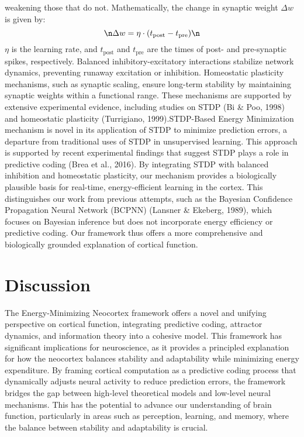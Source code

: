 \documentclass{article}
\begin{document}
weakening those that do not. Mathematically, the change in synaptic weight \(\Delta w\) is given by:\n\begin{equation}\n\Delta w = \eta \cdot (t_{\text{post}} - t_{\text{pre}})\n\end{equation}\nwhere \(\eta\) is the learning rate, and \(t_{\text{post}}\) and \(t_{\text{pre}}\) are the times of post- and pre-synaptic spikes, respectively. Balanced inhibitory-excitatory interactions stabilize network dynamics, preventing runaway excitation or inhibition. Homeostatic plasticity mechanisms, such as synaptic scaling, ensure long-term stability by maintaining synaptic weights within a functional range. These mechanisms are supported by extensive experimental evidence, including studies on STDP (Bi & Poo, 1998) and homeostatic plasticity (Turrigiano, 1999).\n\nThe STDP-Based Energy Minimization mechanism is novel in its application of STDP to minimize prediction errors, a departure from traditional uses of STDP in unsupervised learning. This approach is supported by recent experimental findings that suggest STDP plays a role in predictive coding (Brea et al., 2016). By integrating STDP with balanced inhibition and homeostatic plasticity, our mechanism provides a biologically plausible basis for real-time, energy-efficient learning in the cortex. This distinguishes our work from previous attempts, such as the Bayesian Confidence Propagation Neural Network (BCPNN) (Lansner & Ekeberg, 1989), which focuses on Bayesian inference but does not incorporate energy efficiency or predictive coding. Our framework thus offers a more comprehensive and biologically grounded explanation of cortical function.

\section{Discussion}
The Energy-Minimizing Neocortex framework offers a novel and unifying perspective on cortical function, integrating predictive coding, attractor dynamics, and information theory into a cohesive model. This framework has significant implications for neuroscience, as it provides a principled explanation for how the neocortex balances stability and adaptability while minimizing energy expenditure. By framing cortical computation as a predictive coding process that dynamically adjusts neural activity to reduce prediction errors, the framework bridges the gap between high-level theoretical models and low-level neural mechanisms. This has the potential to advance our understanding of brain function, particularly in areas such as perception, learning, and memory, where the balance between stability and adaptability is crucial.
\end{document}
